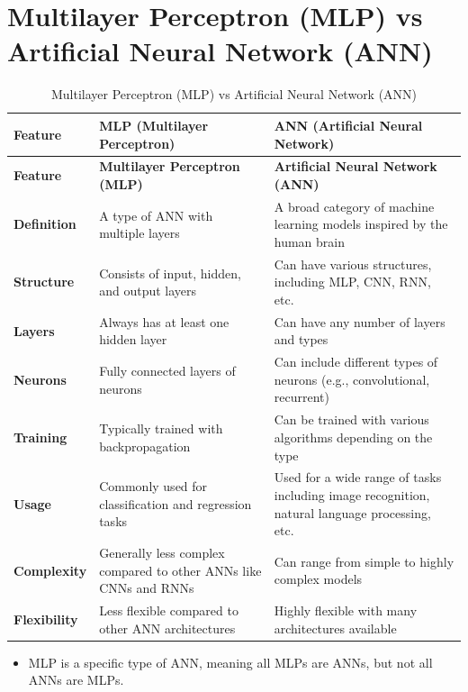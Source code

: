 \section{Multilayer Perceptron (MLP) vs Artificial Neural Network (ANN)}\label{mlp vs ann}
\begin{longtable}{|>{\raggedright}m{4cm}|>{\raggedright}m{5cm}|>{\raggedright\arraybackslash}m{5cm}|}
    \caption{Multilayer Perceptron (MLP) vs Artificial Neural Network (ANN)}\\
    \hline
    \textbf{Feature} & \textbf{MLP (Multilayer Perceptron)} & \textbf{ANN (Artificial Neural Network)} \\
    \hline
    \endfirsthead
    \hline
    \textbf{Feature} & \textbf{Multilayer Perceptron (MLP)} & \textbf{Artificial Neural Network (ANN)} \\
    \hline
    \endhead
    \endfoot
    \hline
    \endlastfoot
    \textbf{Definition} & A type of ANN with multiple layers & A broad category of machine learning models inspired by the human brain \\
    \hline
    \textbf{Structure} & Consists of input, hidden, and output layers & Can have various structures, including MLP, CNN, RNN, etc. \\
    \hline
    \textbf{Layers} & Always has at least one hidden layer & Can have any number of layers and types \\
    \hline
    \textbf{Neurons} & Fully connected layers of neurons & Can include different types of neurons (e.g., convolutional, recurrent) \\
    \hline
    \textbf{Training} & Typically trained with backpropagation & Can be trained with various algorithms depending on the type \\
    \hline
    \textbf{Usage} & Commonly used for classification and regression tasks & Used for a wide range of tasks including image recognition, natural language processing, etc. \\
    \hline
    \textbf{Complexity} & Generally less complex compared to other ANNs like CNNs and RNNs & Can range from simple to highly complex models \\
    \hline
    \textbf{Flexibility} & Less flexible compared to other ANN architectures & Highly flexible with many architectures available \\
\end{longtable}

\begin{itemize}
    \item MLP is a specific type of ANN, meaning all MLPs are ANNs, but not all ANNs are MLPs.
\end{itemize}


